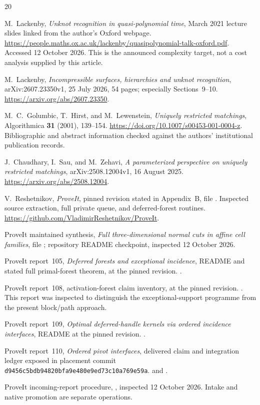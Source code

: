 \documentclass[11pt,letterpaper]{article}
\theoremstyle{definition}
\theoremstyle{remark}
\begin{document}
\begin{thebibliography}{20}
\raggedright

M.~Lackenby, \emph{Unknot recognition in quasi-polynomial time}, March 2021 lecture slides linked from the author's Oxford webpage.
\url{https://people.maths.ox.ac.uk/lackenby/quasipolynomial-talk-oxford.pdf}.
Accessed 12 October 2026. This is the announced complexity target, not a cost analysis supplied by this article.

M.~Lackenby, \emph{Incompressible surfaces, hierarchies and unknot recognition}, arXiv:2607.23350v1, 25 July 2026, 54 pages; especially Sections~9--10.
\url{https://arxiv.org/abs/2607.23350}.

M.~C.~Golumbic, T.~Hirst, and M.~Lewenstein, \emph{Uniquely restricted matchings}, Algorithmica \textbf{31} (2001), 139--154.
\url{https://doi.org/10.1007/s00453-001-0004-z}.
Bibliographic and abstract information checked against the authors' institutional publication records.

J.~Chaudhary, I.~Sau, and M.~Zehavi, \emph{A parameterized perspective on uniquely restricted matchings}, arXiv:2508.12004v1, 16 August 2025.
\url{https://arxiv.org/abs/2508.12004}.

V.~Reshetnikov, \emph{ProveIt}, pinned revision stated in Appendix~B, file
.
Inspected source extraction, full private queue, and deferred-forest routines.
\url{https://github.com/VladimirReshetnikov/ProveIt}.

ProveIt maintained synthesis, \emph{Full three-dimensional normal cuts in affine cell families}, file
; repository README checkpoint, inspected 12 October 2026.

ProveIt report~105, \emph{Deferred forests and exceptional incidence}, README and stated full primal-forest theorem, at the pinned revision.
.

ProveIt report~108, activation-forest claim inventory, at the pinned revision.
.
This report was inspected to distinguish the exceptional-support programme from the present block/path approach.

ProveIt report~109, \emph{Optimal deferred-handle kernels via ordered incidence interfaces}, README at the pinned revision.
.

ProveIt report~110, \emph{Ordered pivot interfaces}, delivered claim and integration ledger exposed in placement commit
\nolinkurl{d9456c5bdb94820bfa9e480e9ed73c10a769e59a}.
 and
.

ProveIt incoming-report procedure, , inspected 12 October 2026. Intake and native promotion are separate operations.

\end{thebibliography}
\end{document}
